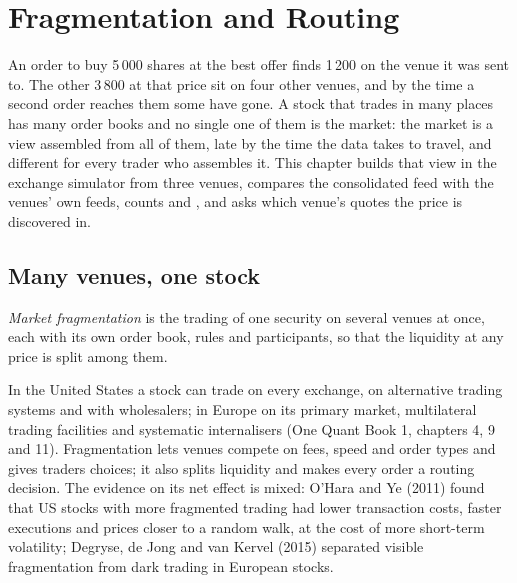\chapter{Fragmentation and Routing}\label{ch:mx:fragmentation-and-routing}

An order to buy 5\,000 shares at the best offer finds 1\,200 on the venue it was sent to. The other 3\,800 at that price sit on four other venues, and by
the time a second order reaches them some have gone. A stock that trades in many places has many order books and no single one of them is the market:
the market is a view assembled from all of them, late by the time the data takes to travel, and different for every trader who assembles it. This
chapter builds that view in the exchange simulator from three venues, compares the consolidated feed with the venues' own feeds, counts  and
, and asks which venue's quotes the price is discovered in.

\section{Many venues, one stock}

\begin{definition}\label{def:mx:fragmentation-and-routing:fragmentation}
\emph{Market fragmentation} is the trading of one security on several venues at once, each with its own order book,
rules and participants, so that the liquidity at any price is split among them.
\end{definition}

In the United States a stock can trade on every exchange, on alternative trading systems and with wholesalers; in Europe on its primary market,
multilateral trading facilities and systematic internalisers (One Quant Book 1, chapters 4, 9 and 11). Fragmentation lets venues compete on fees, speed
and order types and gives traders choices; it also splits liquidity and makes every order a routing decision. The evidence on its net effect is mixed:
O'Hara and Ye (2011) found that US stocks with more fragmented trading had lower transaction costs, faster executions and prices closer to a random walk,
at the cost of more short-term volatility; Degryse, de Jong and van Kervel (2015) separated visible fragmentation from dark trading in European stocks.

